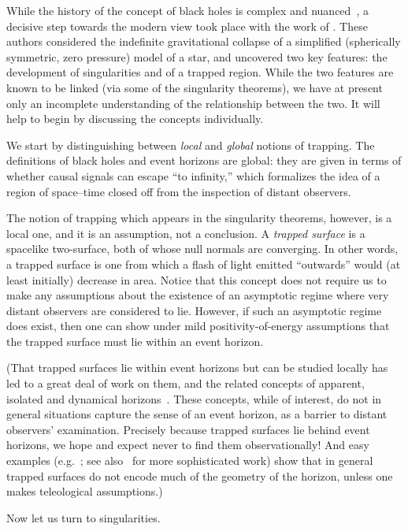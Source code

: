 \documentclass[12pt]{article}
\begin{document}
While the history of the concept of black holes is complex and nuanced~\citep{Israel:1987ae}, a decisive step towards the modern view took place with the work of \citet{Oppenheimer:1939ue}.  These authors considered the indefinite gravitational collapse of a simplified (spherically symmetric, zero pressure) model of a star, and uncovered two key features:  the development of singularities and of a trapped region.
While the two features are known to be linked (via some of the singularity theorems),
we have at present only an incomplete 
understanding of the relationship between the two.  
It will help to begin by discussing the concepts individually.

We start by distinguishing between {\em local} and {\em global} notions of trapping.  The definitions of black holes and event horizons are global:  they are given in terms of whether causal signals can escape ``to infinity,'' which formalizes the idea of a region of space--time closed off from the inspection of distant observers. 

The notion of trapping which appears in the singularity theorems, however, is a local one, and it is an assumption, not a conclusion.  A {\em trapped surface}  is  a spacelike two-surface, both of whose null normals are converging.  In other words, a trapped surface is one from which a flash of light emitted ``outwards'' would (at least initially) decrease in area.
Notice that this concept does not require us to make any assumptions about the existence of an asymptotic regime where very distant observers are considered to lie.  However, if such an asymptotic regime does exist, then one can show under mild positivity-of-energy assumptions that the trapped surface must lie within an event horizon.

(That trapped surfaces lie within event horizons but can be studied locally has led to a great deal of work on them, and the related concepts of apparent, isolated and dynamical horizons~\citep{Hawking:1973uf,Ashtekar:2004cn}.
These concepts, while of interest, do not in general situations capture the sense of an event horizon, as a barrier to distant observers' examination.
Precisely because trapped surfaces lie behind event horizons, we hope and expect never to find them observationally!  And easy examples (e.g.~\citep{Booth:2005qc}; see also~\citep{Williams:2008} for more sophisticated work) show that in general trapped surfaces do not encode much of the geometry of the horizon, unless one makes teleological assumptions.)


Now let us turn to singularities.
\end{document}
